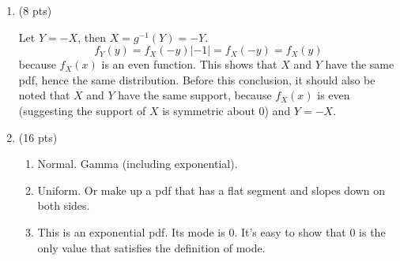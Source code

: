 \documentclass[12pt]{article}
\begin{document}
\begin{enumerate}
\item (8 pts)

Let $Y = -X$, then
$X = g^{-1}(Y) = -Y$.
\[
f_Y(y) = f_X(-y) |-1| = f_X(-y) = f_X(y)
\]
because $f_X(x)$ is an even function.
This shows that $X$ and $Y$ have the same pdf, hence the same
distribution.
Before this conclusion,
it should also be noted that $X$ and $Y$ have the same support,
because $f_X(x)$ is even (suggesting the support of $X$ is symmetric
about 0) and $Y = -X$.

\item (16 pts)

\begin{enumerate}
\item Normal. Gamma (including exponential).
\item Uniform. Or make up a pdf that has a flat segment and slopes down
on both sides.
\item This is an exponential pdf. Its mode is 0.
It's easy to show that 0 is the only value that satisfies the definition
of mode.
\end{enumerate}
\end{enumerate}
\end{document}
